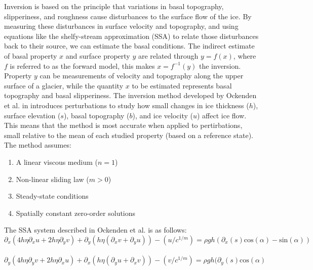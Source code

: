 Inversion is based on the principle that variations in basal topography, slipperiness, and roughness cause disturbances to the surface flow of the ice. By measuring these disturbances in surface velocity and topography, and using equations like the shelfy-stream approximation (SSA) to relate those disturbances back to their source, we can estimate the basal conditions.
The indirect estimate of basal property $x$ and surface property $y$ are related through $y=f(x)$, where $f$ is referred to as the forward model, this makes  $x=f^{-1}(y)$ the inversion. Property $y$ can be measurements of velocity and topography along the upper surface of a glacier, while the quantity $x$ to be estimated represents basal topography and basal slipperiness\cite{Gudmundsson_2008}.
The inversion method developed by Ockenden et al. in\cite{Ockenden_2022} introduces perturbations to study how small changes in ice thickness ($h$), surface elevation ($s$), basal topography ($b$), and ice velocity ($u$) affect ice flow. This means that the method is most accurate when applied to pertirbations, small relative to the mean of each studied property (based on a reference state). The method assumes:
\begin{enumerate}
\item A linear viscous medium ($n=1$)
\item Non-linear sliding law ($m>0$)
\item Steady-state conditions
\item Spatially constant zero-order solutions
\end{enumerate}

The SSA system described in Ockenden et al.\cite{Ockenden_2022} is as follows:
\begin{equation}\partial_{x} (4 h \eta \partial_{x} u + 2 h \eta \partial_y v) + \partial_{y}(h \eta( \partial_{x} v + \partial_{y} u)) - (u/c^{1/m}) = \rho g h ( \partial_{x} (s) \mathrm{cos}(\alpha) - \mathrm{sin}(\alpha))
\end{equation}\label{eq:2.1}\\
\begin{equation}\partial_{y} (4 h \eta \partial_{y} v + 2 h \eta \partial_x u) + \partial_{x}(h \eta( \partial_{y} u + \partial_{x} v)) - (v/c^{1/m}) = \rho g h ( \partial_{y} (s) \mathrm{cos}(\alpha)
\end{equation}\label{eq:2.2}

